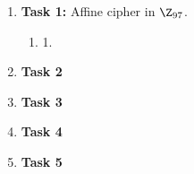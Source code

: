 \documentclass{article}
\begin{document}
\homeworktitle

\begin{enumerate}[label={}]
	\item \textbf{Task 1:} Affine cipher in $\Z_{97}$.
	\begin{enumerate}[label={}]
		\item 1.
	\end{enumerate}
	\item \textbf{Task 2}
	\item \textbf{Task 3}
	\item \textbf{Task 4}
	\item \textbf{Task 5}
\end{enumerate}
\end{document}
